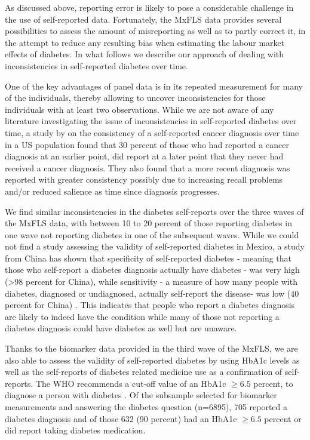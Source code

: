\documentclass[12pt,english,british]{article}
\begin{document}
As discussed above, reporting error is likely to pose a considerable
challenge in the use of self-reported data. Fortunately, the \ac{MxFLS}
data provides several possibilities to assess the amount of misreporting
as well as to partly correct it, in the attempt to reduce any resulting
bias when estimating the labour market effects of diabetes. In what
follows we describe our approach of dealing with inconsistencies in
self-reported diabetes over time.

One of the key advantages of panel data is in its repeated measurement
for many of the individuals, thereby allowing to uncover inconsistencies
for those individuals with at least two observations. While we are
not aware of any literature investigating the issue of inconsistencies
in self-reported diabetes over time, a study by \citet{Zajacova2010}
on the consistency of a self-reported cancer diagnosis over time in
a US population found that 30 percent of those who had reported a
cancer diagnosis at an earlier point, did report at a later point
that they never had received a cancer diagnosis. They also found that
a more recent diagnosis was reported with greater consistency possibly
due to increasing recall problems and/or reduced salience as time
since diagnosis progresses.

We find similar inconsistencies in the diabetes self-reports over
the three waves of the \ac{MxFLS} data, with between 10 to 20 percent
of those reporting diabetes in one wave not reporting diabetes in
one of the subsequent waves. While we could not find a study assessing
the validity of self-reported diabetes in Mexico, a study from China
has shown that specificity of self-reported diabetes - meaning that
those who self-report a diabetes diagnosis actually have diabetes
- was very high (>98 percent for China), while sensitivity - a measure
of how many people with diabetes, diagnosed or undiagnosed, actually
self-report the disease- was low (40 percent for China) \citep{Yuan2015}.
This indicates that people who report a diabetes diagnosis are likely
to indeed have the condition while many of those not reporting
a diabetes diagnosis could have diabetes as well but are unaware.

Thanks to the biomarker data provided in the third wave of the \ac{MxFLS},
we are also able to assess the validity of self-reported diabetes
by using \ac{HbA1c} levels as well as the self-reports of diabetes
related medicine use as a confirmation of self-reports. The \ac{WHO}
recommends a cut-off value of an \ac{HbA1c} $\geq6.5$ percent,
to diagnose a person with diabetes \citep{WorldHealthOrganization2011}.
Of the subsample selected for biomarker measurements and answering
the diabetes question (n=6895), 705 reported a diabetes diagnosis
and of those 632 (90 percent) had an \ac{HbA1c} $\geq6.5$ percent
or did report taking diabetes medication.
\end{document}
